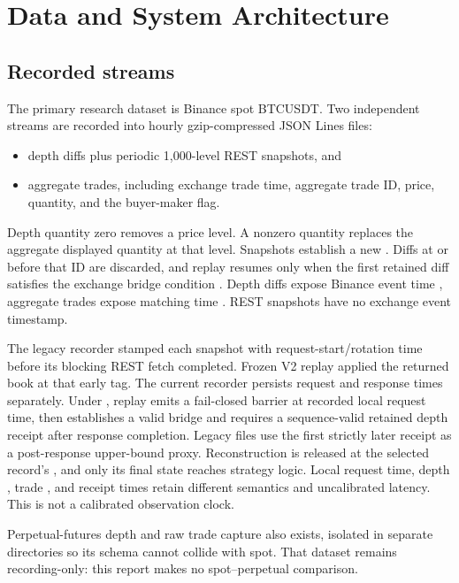 \section{Data and System Architecture}

\subsection{Recorded streams}

The primary research dataset is Binance spot BTCUSDT. Two independent streams
are recorded into hourly gzip-compressed JSON Lines files:

\begin{itemize}
  \item depth diffs plus periodic 1,000-level REST snapshots, and
  \item aggregate trades, including exchange trade time, aggregate trade ID,
        price, quantity, and the buyer-maker flag.
\end{itemize}

Depth quantity zero removes a price level. A nonzero quantity replaces the
aggregate displayed quantity at that level. Snapshots establish a new
. Diffs at or before that ID are discarded, and replay
resumes only when the first retained diff satisfies the exchange bridge
condition \citep{binancews2026,binancerest2026}. Depth diffs expose Binance
event time , aggregate trades expose matching time . REST
snapshots have no exchange event timestamp.

The legacy recorder stamped each snapshot with request-start/rotation time
before its blocking REST fetch completed. Frozen V2 replay applied the returned
book at that early tag. The current recorder persists request and response times
separately. Under , replay emits a
fail-closed barrier at recorded local request time, then establishes a valid
bridge and requires a sequence-valid retained depth receipt after response
completion. Legacy files use the first strictly later receipt as a post-response
upper-bound proxy. Reconstruction is released at the selected record's ,
and only its final state reaches strategy logic. Local request time, depth
, trade , and receipt times retain different semantics and
uncalibrated latency. This is not a calibrated observation clock.

Perpetual-futures depth and raw trade capture also exists, isolated in separate
directories so its schema cannot collide with spot. That dataset remains
recording-only: this report makes no spot--perpetual comparison.

